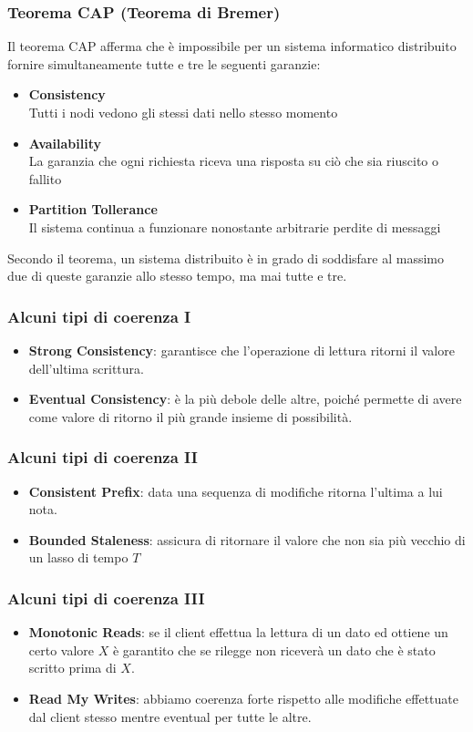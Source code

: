 \begin{frame}
\frametitle{Teorema CAP (Teorema di Bremer)}
	\begin{definizione}
	 Il \alert{teorema CAP} afferma che è impossibile per un sistema informatico distribuito fornire simultaneamente tutte e tre le seguenti garanzie:
	\begin{itemize}
		\item \textbf{Consistency}\\
		Tutti i nodi vedono gli stessi dati nello stesso momento
		\item \textbf{Availability}\\
	    La garanzia che ogni richiesta riceva una risposta su ciò che sia riuscito o fallito
		\item \textbf{Partition Tollerance}\\
		Il sistema continua a funzionare nonostante arbitrarie perdite di messaggi
	\end{itemize}
	Secondo il teorema, un sistema distribuito è in grado di soddisfare al massimo due di queste garanzie allo stesso tempo, ma mai tutte e tre.
	\end{definizione}
\end{frame}

\begin{frame}
\frametitle{Alcuni tipi di coerenza I}
\begin{itemize}
  \item \textbf{Strong Consistency}: garantisce che l'operazione di lettura ritorni il valore dell'ultima scrittura.
  \item \textbf{Eventual Consistency}: è la più debole delle altre, poiché permette di avere come valore di ritorno il più grande insieme di possibilità.
\end{itemize}
\end{frame}

\begin{frame}
\frametitle{Alcuni tipi di coerenza II}
\begin{itemize}
  \item \textbf{Consistent Prefix}: data una sequenza di modifiche ritorna l'ultima a lui nota.
  \item \textbf{Bounded Staleness}: assicura di ritornare il valore che non sia più vecchio di un lasso di tempo $T$
\end{itemize}
\end{frame}

\begin{frame}
\frametitle{Alcuni tipi di coerenza III}
\begin{itemize}
  \item \textbf{Monotonic Reads}: se il client effettua la lettura di un dato ed ottiene un certo valore $X$ è garantito che se rilegge non riceverà un dato che è stato scritto prima di $X$.
  \item \textbf{Read My Writes}: abbiamo coerenza forte rispetto alle modifiche effettuate dal client stesso mentre eventual per tutte le altre.
\end{itemize}
\end{frame}

